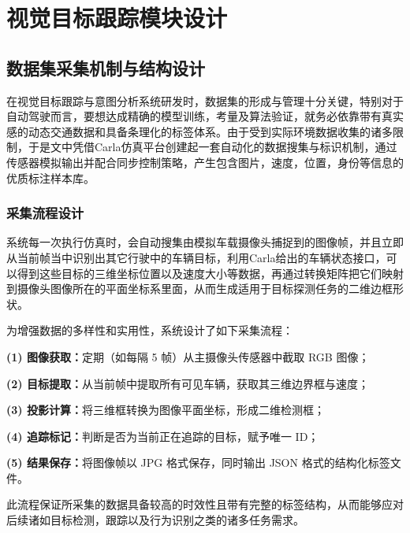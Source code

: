 \chapter{视觉目标跟踪模块设计}

\section{数据集采集机制与结构设计}

在视觉目标跟踪与意图分析系统研发时，数据集的形成与管理十分关键，特别对于自动驾驶而言，要想达成精确的模型训练，考量及算法验证，就务必依靠带有真实感的动态交通数据和具备条理化的标签体系。由于受到实际环境数据收集的诸多限制，于是文中凭借Carla仿真平台创建起一套自动化的数据搜集与标识机制，通过传感器模拟输出并配合同步控制策略，产生包含图片，速度，位置，身份等信息的优质标注样本库。

\subsection{采集流程设计}

系统每一次执行仿真时，会自动搜集由模拟车载摄像头捕捉到的图像帧，并且立即从当前帧当中识别出其它行驶中的车辆目标，利用Carla给出的车辆状态接口，可以得到这些目标的三维坐标位置以及速度大小等数据，再通过转换矩阵把它们映射到摄像头图像所在的平面坐标系里面，从而生成适用于目标探测任务的二维边框形状。

为增强数据的多样性和实用性，系统设计了如下采集流程：

\textbf{(1)	图像获取：}定期（如每隔 5 帧）从主摄像头传感器中截取 RGB 图像；

\textbf{(2)	目标提取：}从当前帧中提取所有可见车辆，获取其三维边界框与速度；

\textbf{(3)	投影计算：}将三维框转换为图像平面坐标，形成二维检测框；

\textbf{(4)	追踪标记：}判断是否为当前正在追踪的目标，赋予唯一 ID；

\textbf{(5)	结果保存：}将图像帧以 JPG 格式保存，同时输出 JSON 格式的结构化标签文件。

此流程保证所采集的数据具备较高的时效性且带有完整的标签结构，从而能够应对后续诸如目标检测，跟踪以及行为识别之类的诸多任务需求。

